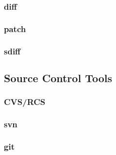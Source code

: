 \subsubsection{diff}
\subsubsection{patch}
\subsubsection{sdiff}

\subsection{Source Control Tools}
\subsubsection{CVS/RCS}
\subsubsection{svn}
\subsubsection{git}
